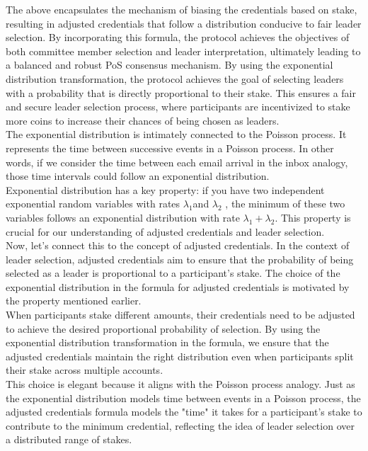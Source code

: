 The above encapsulates the mechanism of biasing the credentials based on stake, resulting in adjusted credentials that follow a distribution conducive to fair leader selection. By incorporating this formula, the protocol achieves the objectives of both committee member selection and leader interpretation, ultimately leading to a balanced and robust PoS consensus mechanism. By using the exponential distribution transformation, the protocol achieves the goal of selecting leaders with a probability that is directly proportional to their stake. This ensures a fair and secure leader selection process, where participants are incentivized to stake more coins to increase their chances of being chosen as leaders.\\
The exponential distribution is intimately connected to the Poisson process. It represents the time between successive events in a Poisson process. In other words, if we consider the time between each email arrival in the inbox analogy, those time intervals could follow an exponential distribution.\\
Exponential distribution has a key property: if you have two independent exponential random variables with rates $\lambda_1$and $\lambda_2$ , the minimum of these two variables follows an exponential distribution with rate 
$\lambda_1 + \lambda_2$. This property is crucial for our understanding of adjusted credentials and leader selection.\\
Now, let's connect this to the concept of adjusted credentials. In the context of leader selection, adjusted credentials aim to ensure that the probability of being selected as a leader is proportional to a participant's stake. The choice of the exponential distribution in the formula for adjusted credentials is motivated by the property mentioned earlier.\\
When participants stake different amounts, their credentials need to be adjusted to achieve the desired proportional probability of selection. By using the exponential distribution transformation in the formula, we ensure that the adjusted credentials maintain the right distribution even when participants split their stake across multiple accounts.\\
This choice is elegant because it aligns with the Poisson process analogy. Just as the exponential distribution models time between events in a Poisson process, the adjusted credentials formula models the "time" it takes for a participant's stake to contribute to the minimum credential, reflecting the idea of leader selection over a distributed range of stakes.
